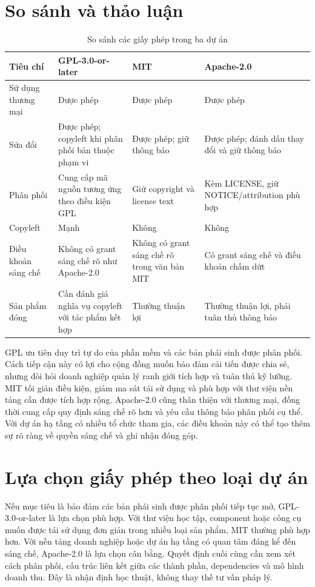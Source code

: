 \documentclass[12pt,a4paper]{article}
\begin{document}
\section{So sánh và thảo luận}
\begin{table}[ht]
\centering
\caption{So sánh các giấy phép trong ba dự án}
\small
\begin{tabularx}{\textwidth}{>{\raggedright\arraybackslash}p{2.4cm}XXX}
\toprule
\textbf{Tiêu chí} & \textbf{GPL-3.0-or-later} & \textbf{MIT} & \textbf{Apache-2.0}\\
\midrule
Sử dụng thương mại & Được phép & Được phép & Được phép\\
Sửa đổi & Được phép; copyleft khi phân phối bản thuộc phạm vi & Được phép; giữ thông báo & Được phép; đánh dấu thay đổi và giữ thông báo\\
Phân phối & Cung cấp mã nguồn tương ứng theo điều kiện GPL & Giữ copyright và license text & Kèm LICENSE, giữ NOTICE/attribution phù hợp\\
Copyleft & Mạnh & Không & Không\\
Điều khoản sáng chế & Không có grant sáng chế rõ như Apache-2.0 & Không có grant sáng chế rõ trong văn bản MIT & Có grant sáng chế và điều khoản chấm dứt\\
Sản phẩm đóng & Cần đánh giá nghĩa vụ copyleft với tác phẩm kết hợp & Thường thuận lợi & Thường thuận lợi, phải tuân thủ thông báo\\
\bottomrule
\end{tabularx}
\end{table}

GPL ưu tiên duy trì tự do của phần mềm và các bản phái sinh được phân phối. Cách tiếp cận này có lợi cho cộng đồng muốn bảo đảm cải tiến được chia sẻ, nhưng đòi hỏi doanh nghiệp quản lý ranh giới tích hợp và tuân thủ kỹ lưỡng. MIT tối giản điều kiện, giảm ma sát tái sử dụng và phù hợp với thư viện nền tảng cần được tích hợp rộng. Apache-2.0 cũng thân thiện với thương mại, đồng thời cung cấp quy định sáng chế rõ hơn và yêu cầu thông báo phân phối cụ thể. Với dự án hạ tầng có nhiều tổ chức tham gia, các điều khoản này có thể tạo thêm sự rõ ràng về quyền sáng chế và ghi nhận đóng góp.

\section{Lựa chọn giấy phép theo loại dự án}
Nếu mục tiêu là bảo đảm các bản phái sinh được phân phối tiếp tục mở, GPL-3.0-or-later là lựa chọn phù hợp. Với thư viện học tập, component hoặc công cụ muốn được tái sử dụng đơn giản trong nhiều loại sản phẩm, MIT thường phù hợp hơn. Với nền tảng doanh nghiệp hoặc dự án hạ tầng có quan tâm đáng kể đến sáng chế, Apache-2.0 là lựa chọn cân bằng. Quyết định cuối cùng cần xem xét cách phân phối, cấu trúc liên kết giữa các thành phần, dependencies và mô hình doanh thu. Đây là nhận định học thuật, không thay thế tư vấn pháp lý.
\end{document}
